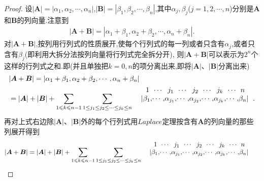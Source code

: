 \documentclass[../../main.tex]{subfiles}
\begin{document}
\begin{proof}
设\(|\boldsymbol{A}| = |\alpha_1,\alpha_2,\cdots,\alpha_n|\),\(|\boldsymbol{B}| = |\beta_1,\beta_2,\cdots,\beta_n|\),其中\(\alpha_j,\beta_j\)(\(j = 1,2,\cdots,n\))分别是\(\boldsymbol{A}\)和\(\boldsymbol{B}\)的列向量.注意到
\begin{align*}
|\boldsymbol{A} + \boldsymbol{B}| = |\alpha_1 + \beta_1,\alpha_2 + \beta_2,\cdots,\alpha_n + \beta_n|.
\end{align*}
对\(|\boldsymbol{A} + \boldsymbol{B}|\),按列用行列式的性质展开,使每个行列式的每一列或者只含有\(\alpha_j\),或者只含有\(\beta_j\)(即利用大拆分法按列向量将行列式完全拆分开),
则\(|\boldsymbol{A} + \boldsymbol{B}|\)可以表示为\(2^n\)个这样的行列式之和.即(并且单独把\(k = 0,n\)的项分离出来,即将\(|\boldsymbol{A}|\)、\(|\boldsymbol{B}|\)分离出来)
\begin{align*}
&|\boldsymbol{A} + \boldsymbol{B}| = |\alpha_1 + \beta_1,\alpha_2 + \beta_2,\cdots,\alpha_n + \beta_n| 
\\
&=|\boldsymbol{A}|+|\boldsymbol{B}|+\sum_{1\leqslant k\leqslant n-1}{\sum_{1\leq j_1\leq j_2\leq \cdots\leq j_k\leq n}{\begin{array}{c}
\begin{array}{c@{}c@{}c@{}c@{}c@{}c@{}c@{}c@{}c@{}c@{}c@{}}
& 1 & \cdots & j_1 &\cdots &j_2 &\cdots &j_k &\cdots &n \\
\left.\right|
&\beta _1,&\cdots ,&\alpha _{j_1},&\cdots ,&\alpha_{j_2},&\cdots ,&\alpha_{j_k},&\cdots ,&\beta_n& \left|\right.
\end{array}\\
\\
\end{array}}}.
\end{align*}
再对上式右边除\(|\boldsymbol{A}|\)、\(|\boldsymbol{B}|\)外的每个行列式用\(Laplace\)定理按含有\(\boldsymbol{A}\)的列向量的那些列展开得到
\begin{align*}
&|\boldsymbol{A} + \boldsymbol{B}| =|\boldsymbol{A}|+|\boldsymbol{B}|+\sum_{1\leqslant k\leqslant n-1}{\sum_{1\leq j_1\leq j_2\leq \cdots\leq j_k\leq n}{\begin{array}{c}
\begin{array}{c@{}c@{}c@{}c@{}c@{}c@{}c@{}c@{}c@{}c@{}c@{}}
& 1 & \cdots & j_1 &\cdots &j_2 &\cdots &j_k &\cdots &n \\
\left.\right|
&\beta _1,&\cdots ,&\alpha _{j_1},&\cdots ,&\alpha_{j_2},&\cdots ,&\alpha_{j_k},&\cdots ,&\beta_n& \left|\right.
\end{array}\\
\\

\end{array}}}
\end{align*}
\end{proof}
\end{document}
